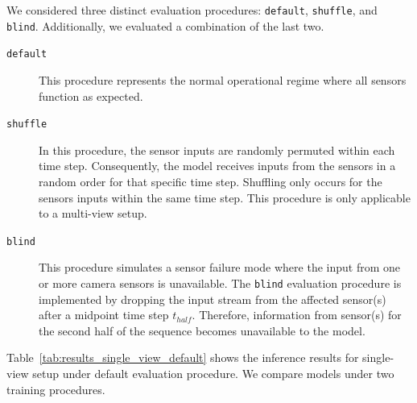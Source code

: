 We considered three distinct evaluation procedures: \texttt{default}, \texttt{shuffle}, and \texttt{blind}. Additionally, we evaluated a combination of the last two.

\begin{description}
    \item[\texttt{default}] This procedure represents the normal operational regime where all sensors function as expected.

    \item[\texttt{shuffle}] In this procedure, the sensor inputs are randomly permuted within each time step. Consequently, the model receives inputs from the sensors in a random order for that specific time step. Shuffling only occurs for the sensors inputs within the same time step. This procedure is only applicable to a multi-view setup.

    \item[\texttt{blind}] This procedure simulates a sensor failure mode where the input from one or more camera sensors is unavailable. The \texttt{blind} evaluation procedure is implemented by dropping the input stream from the affected sensor(s) after a midpoint time step $t_{half}$. Therefore, information from sensor(s) for the second half of the sequence becomes unavailable to the model. 
\end{description}



Table~\ref{tab:results_single_view_default} shows the inference results for single-view setup under default evaluation procedure. We compare models under two training procedures. 


